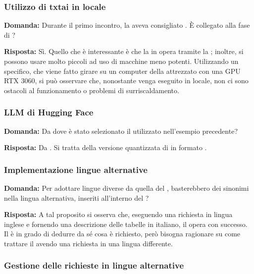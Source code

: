 \subsubsection{Utilizzo di txtai in locale}

\textbf{Domanda:} Durante il primo incontro, la  aveva consigliato . È collegato alla fase di ?

\textbf{Risposta:} Sì. Quello che è interessante è che la  in  opera tramite la ; inoltre, si possono usare  molto piccoli ad uso di macchine meno potenti.
Utilizzando un  specifico, che viene fatto girare su un computer della  attrezzato con una GPU RTX 3060, si può osservare che, nonostante venga eseguito in locale, non ci sono ostacoli al funzionamento o problemi di surriscaldamento.


\subsubsection{LLM di Hugging Face}

\textbf{Domanda:} Da dove è stato selezionato il  utilizzato nell'esempio precedente?

\textbf{Risposta:} Da . Si tratta della versione quantizzata di  in formato .

\subsubsection{Implementazione lingue alternative}

\textbf{Domanda:} Per adottare lingue diverse da quella del , basterebbero dei sinonimi nella lingua alternativa, inseriti all'interno del ?

\textbf{Risposta:} A tal proposito si osserva che, eseguendo una richiesta in lingua inglese e fornendo una descrizione delle tabelle in italiano, il  opera con successo.
Il  è in grado di dedurre da sé cosa è richiesto, però bisogna ragionare su come trattare il  avendo una richiesta in una lingua differente.

\subsubsection{Gestione delle richieste in lingue alternative}

